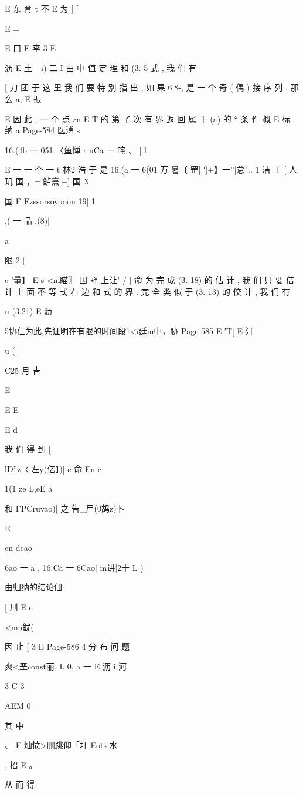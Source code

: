 {E 东 育
t 不
E
为
[
[

E ={

E
口
E 李 3
E

沥
E
土 _i) 二 I 由 中 值 定 理 和 (3. 5 式 , 我 们 有

[ 刀 团 于
这 里 我 们 要 特 别 指 出 , 如 果 {6,}8-, 是 一 个 奇 ( 偶 ) 接 序 列 , 那 么 a;
E 振

E
因 此 , 一 个 点 zn E T 的 第 了 次 有 界 返 回 属 于 (a) 的 “ 条 件 概
E 标 纳 a
Page-584
医溥 s

16.(4b 一 051 〈鱼惮 r uCa 一 咤 、
[ l

E 一 一 个 一
t 林2 浩
于 是
16,(a 一 6(01 万 暑〔 罡] ′]+】一”|怠'… 1 洁 工
[
人 玑 国
，=′鲈熹′+] 国 X

国
E Ezssorsoyooon
19] 1

,( 一 品 ,(8)|

a

限 2
[

c '量】 E
s <m瞄〗 国 驿 上让'
/ [ 命
为 完 成 (3. 18) 的 估 计 , 我 们 只 要 佶 计 上 面 不 等 式 右 边 和 式 的
界 . 完 全 类 似 于 (3. 13) 的 佼 计 , 我 们 有

u (3.21)
E 沥

5协仁为此,先证明在有限的时间段1<i廷m中，胁
Page-585
E
′T[ E 汀

u (

C25 月 吉

E

E
E

E
d

我 们 得 到
[

lD”z〈|左y(亿】)| c 命 En c

1(1 ze L,eE a

和
FPCruvao)| 之 告_尸(0鸪z)卜

E

cn
dcao

6ao 一 a , 16.Ca 一 6Cao|
m讲[2十 L )

由归纳的结论佃%

[ 刑
E e

<mn鱿(

因 止
[ 3
E
Page-586
4 分 布 问 题

爽<垩const丽, L
0, a 一
E 沥 i 河

3
C
3

AEM 0

其 中

、 E 灿愤>删跳仰「圩
Eots 水

, 招
E 。

从 而 得

}}

